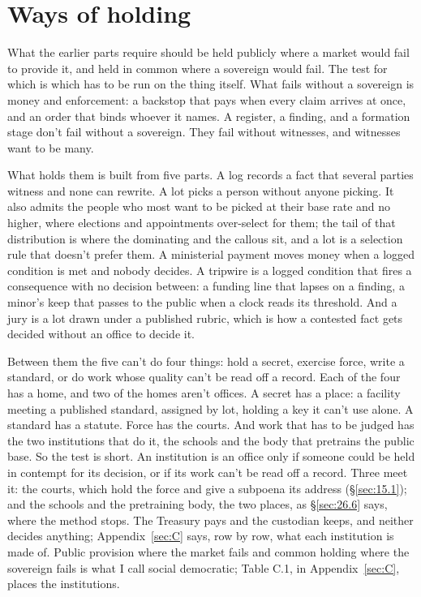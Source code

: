 \section{Ways of holding}
\label{sec:16.1}
What the earlier parts require should be held publicly where a market would fail to provide it, and held in common where a sovereign would fail. The test for which is which has to be run on the thing itself. What fails without a sovereign is money and enforcement: a backstop that pays when every claim arrives at once, and an order that binds whoever it names. A register, a finding, and a formation stage don't fail without a sovereign. They fail without witnesses, and witnesses want to be many.

What holds them is built from five parts. A log records a fact that several parties witness and none can rewrite. A lot picks a person without anyone picking. It also admits the people who most want to be picked at their base rate and no higher, where elections and appointments over-select for them; the tail of that distribution is where the dominating and the callous sit, and a lot is a selection rule that doesn't prefer them. A ministerial payment moves money when a logged condition is met and nobody decides. A tripwire is a logged condition that fires a consequence with no decision between: a funding line that lapses on a finding, a minor's keep that passes to the public when a clock reads its threshold. And a jury is a lot drawn under a published rubric, which is how a contested fact gets decided without an office to decide it.

Between them the five can't do four things: hold a secret, exercise force, write a standard, or do work whose quality can't be read off a record. Each of the four has a home, and two of the homes aren't offices. A secret has a place: a facility meeting a published standard, assigned by lot, holding a key it can't use alone. A standard has a statute. Force has the courts. And work that has to be judged has the two institutions that do it, the schools and the body that pretrains the public base. So the test is short. An institution is an office only if someone could be held in contempt for its decision, or if its work can't be read off a record. Three meet it: the courts, which hold the force and give a subpoena its address (\S\ref{sec:15.1}); and the schools and the pretraining body, the two places, as \S\ref{sec:26.6} says, where the method stops. The Treasury pays and the custodian keeps, and neither decides anything; Appendix~\ref{sec:C} says, row by row, what each institution is made of. Public provision where the market fails and common holding where the sovereign fails is what I call social democratic; Table C.1, in Appendix~\ref{sec:C}, places the institutions.

